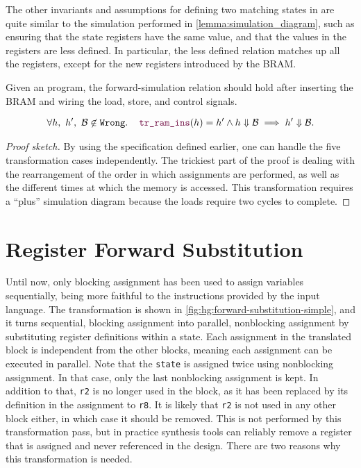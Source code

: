 The other invariants and assumptions for defining two matching states in \htl{}
are quite similar to the simulation performed in
\cref{lemma:simulation_diagram}, such as ensuring that the state registers have
the same value, and that the values in the registers are less defined.  In
particular, the less defined relation matches up all the registers, except for
the new registers introduced by the \gls{BRAM}.

\begin{lemma}\label{lemma:htl_ram}
  Given an \htl{} program, the forward-simulation relation should hold after
  inserting the \gls{BRAM} and wiring the load, store, and control signals.

  \begin{align*}
    \forall h,\ h',\ \mathcal{B} \not\in \texttt{Wrong}\ldotp\quad \yhfunction{tr\_ram\_ins}(h) = h' \land h \Downarrow \mathcal{B} \implies h' \Downarrow \mathcal{B}.
  \end{align*}

  \begin{proof}[Proof sketch]
    By using the specification defined earlier, one can handle the five
    transformation cases independently.  The trickiest part of the proof is
    dealing with the rearrangement of the order in which assignments are
    performed, as well as the different times at which the memory is accessed.
    This transformation requires a \enquote{plus} simulation diagram because the
    loads require two cycles to complete.
  \end{proof}
\end{lemma}

\section{Register Forward Substitution}%
\label{sec:hg:register-forward-substitution}

Until now, only blocking assignment has been used to assign variables
sequentially, being more faithful to the instructions provided by the input
language.  The transformation is shown in
\cref{fig:hg:forward-substitution-simple}, and it turns sequential, blocking
assignment into parallel, nonblocking assignment by substituting register
definitions within a state.  Each assignment in the translated block is
independent from the other blocks, meaning each assignment can be executed in
parallel.  Note that the \texttt{state} is assigned twice using nonblocking
assignment.  In that case, only the last nonblocking assignment is kept.  In
addition to that, \texttt{r2} is no longer used in the block, as it has been
replaced by its definition in the assignment to \texttt{r8}.  It is likely that
\texttt{r2} is not used in any other block either, in which case it should be
removed.  This is not performed by this transformation pass, but in practice
synthesis tools can reliably remove a register that is assigned and never
referenced in the design.  There are two reasons why this transformation is
needed.

